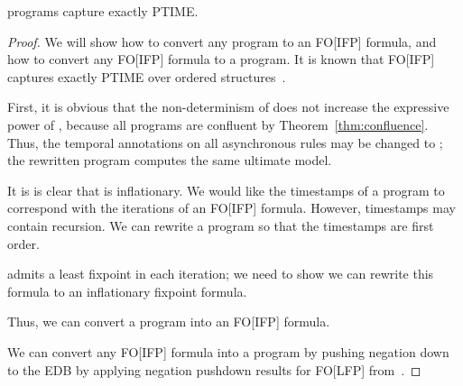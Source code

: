 \begin{theorem}
\slang programs capture exactly PTIME.
\end{theorem}
\begin{proof}
We will show how to convert any \slang program to an FO[IFP] formula, and how to convert any FO[IFP] formula to a \slang program.  It is known that FO[IFP] captures exactly PTIME over ordered structures~\cite{immerman-ptime}.

First, it is obvious that the non-determinism of  does not increase the expressive power of \slang, because all \slang programs are confluent by Theorem~\ref{thm:confluence}.  Thus, the temporal annotations on all asynchronous rules may be changed to ; the rewritten program computes the same ultimate model.  

It is is clear that \slang is inflationary.  We would like the timestamps of a \slang program to correspond with the iterations of an FO[IFP] formula.  However, \slang timestamps may contain recursion.  We can rewrite a \slang program so that the timestamps are first order.  

\slang admits a least fixpoint in each iteration; we need to show we can rewrite this formula to an inflationary fixpoint formula.  

Thus, we can convert a \slang program into an FO[IFP] formula.

We can convert any FO[IFP] formula into a \slang program by pushing negation down to the EDB by applying negation pushdown results for FO[LFP] from~\cite{immerman-ptime}.  

\end{proof}



